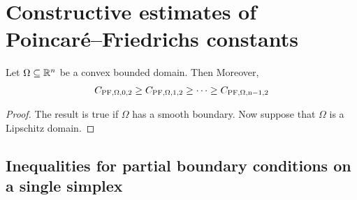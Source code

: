 \documentclass[12pt,a4paper]{article}
\begin{document}
\section{Constructive estimates of Poincar\'e--Friedrichs constants}\label{section:poincarefriedrichs}





\begin{proposition}\label{proposition:guerinisavo}
    Let $\Omega \subseteq {\mathbb R}^{n}$ be a convex bounded domain. Then 
    Moreover, 
    \begin{align*}
        C_{\rm{PF},\Omega,0,2} \geq C_{\rm{PF},\Omega,1,2} \geq \dots \geq C_{\rm{PF},\Omega,n-1,2}
    \end{align*}
\end{proposition}
\begin{proof}
    The result is true if $\Omega$ has a smooth boundary. 
    Now suppose that $\Omega$ is a Lipschitz domain. 
\end{proof}










\subsection{Inequalities for partial boundary conditions on a single simplex}
\end{document}
